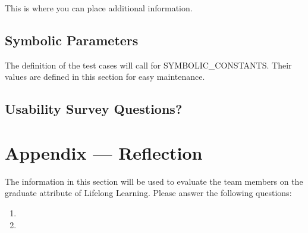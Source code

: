 \documentclass[12pt, titlepage]{article}
\begin{document}
This is where you can place additional information.

\subsection{Symbolic Parameters}

The definition of the test cases will call for SYMBOLIC\_CONSTANTS.
Their values are defined in this section for easy maintenance.

\subsection{Usability Survey Questions?}


\newpage{}
\section*{Appendix --- Reflection}

The information in this section will be used to evaluate the team members on the
graduate attribute of Lifelong Learning.  Please answer the following questions:

\begin{enumerate}
  \item 
  \item 
\end{enumerate}
\end{document}
